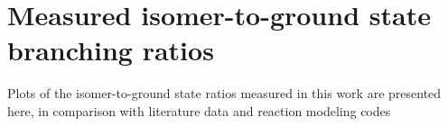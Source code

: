 % 
% 


% 
% 
\section{Measured isomer-to-ground state branching ratios } \label{sec:fe_ibr_figures}

Plots of the isomer-to-ground state ratios measured in this work are presented here, in comparison with literature data and reaction modeling codes 




     

